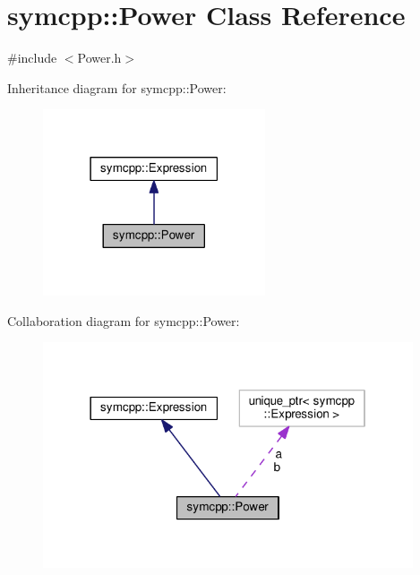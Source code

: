 \hypertarget{classsymcpp_1_1Power}{}\section{symcpp\+:\+:Power Class Reference}
\label{classsymcpp_1_1Power}


{\ttfamily \#include $<$Power.\+h$>$}



Inheritance diagram for symcpp\+:\+:Power\+:\nopagebreak
\begin{figure}[H]
\begin{center}
\leavevmode
\includegraphics[width=186pt]{classsymcpp_1_1Power__inherit__graph}
\end{center}
\end{figure}


Collaboration diagram for symcpp\+:\+:Power\+:\nopagebreak
\begin{figure}[H]
\begin{center}
\leavevmode
\includegraphics[width=310pt]{classsymcpp_1_1Power__coll__graph}
\end{center}
\end{figure}
